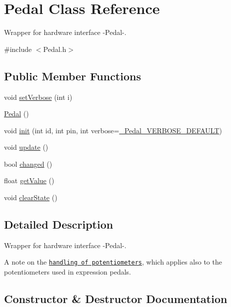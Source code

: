 \hypertarget{class_pedal}{}\section{Pedal Class Reference}
\label{class_pedal}


Wrapper for hardware interface -\/\+Pedal-\/.  




{\ttfamily \#include $<$Pedal.\+h$>$}

\subsection*{Public Member Functions}
\begin{DoxyCompactItemize}
\item 
void \mbox{\hyperlink{class_pedal_a26c6025e6e3b8ff839024e76b00effc3}{set\+Verbose}} (int i)
\item 
\mbox{\hyperlink{class_pedal_a7a2bd6bd3f141509e4d20ecf58b18f97}{Pedal}} ()
\item 
void \mbox{\hyperlink{class_pedal_aff27b41419b893be77fcdbbc7c1c623d}{init}} (int id, int pin, int verbose=\mbox{\hyperlink{_pedal_8h_aef931352995575197c1519d764ea7ef6}{\+\_\+\+Pedal\+\_\+\+V\+E\+R\+B\+O\+S\+E\+\_\+\+D\+E\+F\+A\+U\+LT}})
\item 
void \mbox{\hyperlink{class_pedal_aa696e50f79dc3723a9b434f9895a8e81}{update}} ()
\item 
bool \mbox{\hyperlink{class_pedal_ac80c8219516f356b764f998d6a135d13}{changed}} ()
\item 
float \mbox{\hyperlink{class_pedal_a4eb87f8ea643d6723bb468e01b3179df}{get\+Value}} ()
\item 
void \mbox{\hyperlink{class_pedal_a2d8c1db9ddf3d92b354d0f9937802bc6}{clear\+State}} ()
\end{DoxyCompactItemize}


\subsection{Detailed Description}
Wrapper for hardware interface -\/\+Pedal-\/. 

A note on the \href{http://cbmalloch.umasscreate.net/wp/uncategorized/the-overloading-of-potentiometers/}{\tt handling of potentiometers}, which applies also to the potentiometers used in expression pedals. 

\subsection{Constructor \& Destructor Documentation}
\mbox{\label{class_pedal_a7a2bd6bd3f141509e4d20ecf58b18f97}} 
